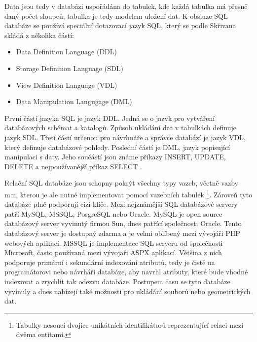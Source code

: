 Data jsou tedy v databázi uspořádána do tabulek, kde každá tabulka má přesně daný počet sloupců, tabulka je tedy modelem uložení dat. 
K obsluze SQL databáze se používá speciální dotazovací jazyk SQL, který se podle Skřivana skládá z několika částí:
\begin{itemize}
\item Data Definition Language (DDL)
\item Storage Definition Language (SDL)
\item View Definition Language (VDL)
\item Data Manipulation Langugage (DML)
\end{itemize}
První částí jazyka SQL je jazyk DDL. Jedná se o jazyk pro vytváření databázových schémat a katalogů. Způsob ukládání dat v tabulkách definuje jazyk SDL. Třetí částí určenou pro návrhnáře a správce databází je jazyk VDL, který definuje databázové pohledy. Poslední částí je DML, jazyk popisující manipulaci s daty. Jeho součástí jsou známe příkazy INSERT, UPDATE, DELETE a nejpoužívanější příkaz SELECT \cite{sqlDatabaze}.

Relační SQL databáze jsou schopny pokrýt všechny typy vazeb, včetně vazby m:n, kterou je ale nutné implementovat pomocí vazebních tabulek \footnote{Tabulky nesoucí dvojice unikátních identifikátorů reprezentující relaci mezi dvěma entitami.}. Zároveň tyto databáze plně podporují cizí klíče. Mezi nejznámější SQL databázové servery patří MySQL, MSSQL, PosgreSQL nebo Oracle. MySQL je open source databázový server vyvinutý firmou Sun, dnes patřící společnosti Oracle. Tento databázový server je dostupný zdarma a je velmi oblíbený mezi vývojáři PHP webových aplikací. MSSQL je implementace SQL serveru od společnosti Microsoft, často používaná mezi vývojaři ASPX aplikací.
Většina z nich podporuje primární i sekundární indexování atributů, tedy je čistě na programátorovi nebo návrháři databáze, aby navrhl atributy, které bude vhodné indexovat a zrychlit tak odezvu databáze. Postupem času se tyto databáze vyvinuly a dnes nabízejí také možnosti pro ukládání souborů nebo geometrických dat.

